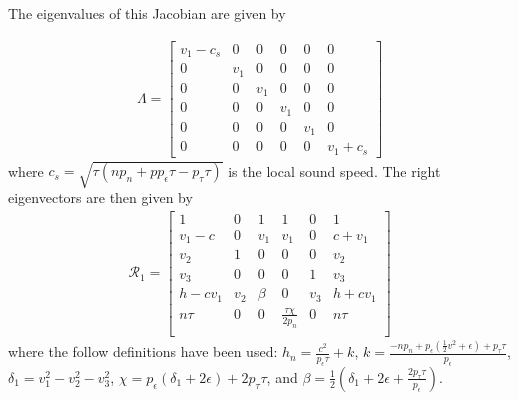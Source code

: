 \documentclass[onecolumn]{aastex62}
\begin{document}
\noindent The eigenvalues of this Jacobian are given by

\begin{align}
\Lambda =
\begin{bmatrix}
  v_{1} - c_{s} & 0 & 0& 0& 0& 0\\
  0 & v_{1} & 0 & 0 & 0 & 0 \\
  0 & 0 & v_{1} & 0 & 0 & 0 \\
  0 & 0 & 0 & v_{1} & 0 & 0 \\
  0 & 0 & 0 & 0 & v_{1} & 0 \\
  0 & 0 & 0 & 0 & 0 & v_{1} + c_{s}
\end{bmatrix}
\end{align}
where $c_{s} = \sqrt{\tau (n p_{n} + p p_{\epsilon}\tau - p_{\tau}\tau)}$ is
the local sound speed. The right eigenvectors are then given by
\begin{align*}
  \mathcal{R}_{1} =
  \left[
  \begin{array}{cccccc}
   1 & 0 & 1 & 1 & 0 & 1 \\
   v_{1}-c & 0 & v_{1} & v_{1} & 0 & c+v_{1} \\
   v_{2} & 1 & 0 & 0 & 0 & v_{2} \\
   v_{3} & 0 & 0 & 0 & 1 & v_{3} \\
   h-c v_{1} & v_{2} & \beta & 0 & v_{3} & h+c v_{1} \\
   n \tau  & 0 & 0 & \frac{\tau  \chi }{2 p_{n}} & 0 & n \tau  \\
  \end{array}
  \right]
\end{align*}
where the follow definitions have been used:
$h_{n} = \frac{c^2}{p_{\epsilon}\tau} + k $, $k = \frac{-n p_{n}
+ p_{\epsilon} (\frac{1}{2}v^2 + \epsilon) + p_{\tau}\tau}{p_{\epsilon}}$,
$\delta_{1} = v_{1}^{2}-v_{2}^{2}-v_{3}^{2}$,
$\chi = p_{\epsilon} ( \delta_{1} + 2\epsilon) + 2p_{\tau}\tau$, and
$\beta = \frac{1}{2} (\delta_{1}+2 \epsilon +\frac{2 p_{\tau} \tau }{p_{\epsilon}})$.
\end{document}
